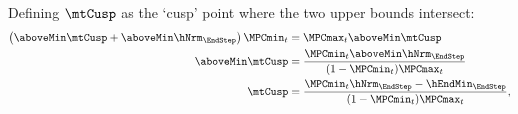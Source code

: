   Defining $\mtCusp$ as the `cusp' point where the two upper bounds
  intersect:
  \begin{equation*}\begin{gathered}\begin{aligned}
        \left(\aboveMin \mtCusp+\aboveMin \hNrm_{\EndStep}\right)\MPCmin_{t}  & =  \MPCmax_{t} \aboveMin \mtCusp \\
        \aboveMin \mtCusp  & =  \frac{\MPCmin_{t}\aboveMin \hNrm_{\EndStep}}{(1-\MPCmin_{t})\MPCmax_{t}} \\
        \mtCusp  & =  \frac{\MPCmin_{t}\hNrm_{\EndStep}-\hEndMin_{\EndStep}}{(1-\MPCmin_{t})\MPCmax_{t}},
      \end{aligned}\end{gathered}\end{equation*}
